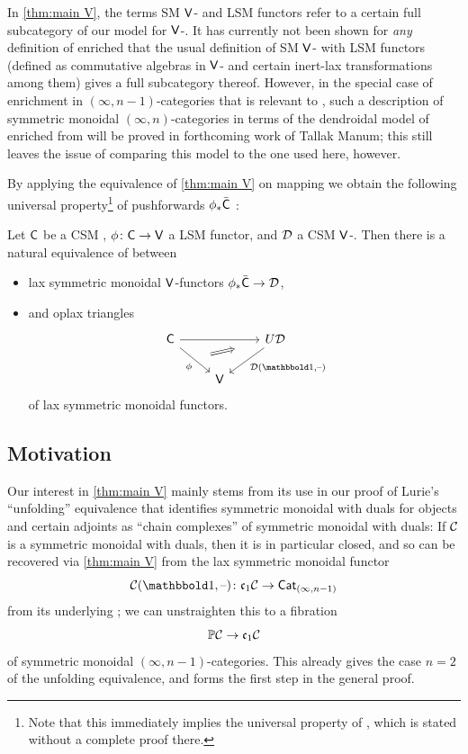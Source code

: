 \documentclass[a4paper,11pt]{article}
\newcommand{\SM}{SM}
\newcommand{\LSM}{LSM}
\newcommand{\CSM}{CSM}
\begin{document}
\begin{warning*}
  In \cref{thm:main V}, the terms \SM{} $\textup{\textsf{V}}$-\icats{} and \LSM{}
  functors refer to a certain full subcategory of our model for
  $\textup{\textsf{V}}$-\iopds{}. It has currently not been shown for \emph{any}
  definition of enriched \iopds{} that the usual definition of \SM{}
  $\textup{\textsf{V}}$-\icats{} with \LSM{} functors (defined as commutative algebras
  in $\textup{\textsf{V}}$-\icats{} and certain inert-lax transformations among them)
  gives a full subcategory thereof. However, in the special case of
  enrichment in $(\infty,n-1)$-categories that is relevant to
  \cite{unfolding}, such a description of symmetric monoidal
  $(\infty,n)$-categories in terms of the dendroidal model of enriched
  \iopds{} from \cite{enropd} will be proved in forthcoming work of
  Tallak Manum; this still leaves the issue of comparing this model to
  the one used here, however.
\end{warning*}

By applying the equivalence of \cref{thm:main V} on
mapping \icats{}
we obtain the following universal property\footnote{Note that this immediately implies the universal property of
\cite[Proposition 1.3.3]{GRV}, which is stated without a complete
proof there.} of pushforwards
$\phi_{*}\bar{\textup{\textsf{C}}}$ :
\begin{corint}
  Let $\textup{\textsf{C}}$ be a \CSM{} \icat{}, $\phi \colon \oC \to \oV$ a \LSM{}
  functor, and $\mathcal{D}$ a \CSM{} $\textup{\textsf{V}}$-\icat{}. Then there is a natural
  equivalence of \icats{} between
  \begin{itemize}
  \item   lax symmetric monoidal $\textup{\textsf{V}}$-functors $\phi_{*}\bar{\oC} \to
    \eD$,
  \item and oplax triangles
        \[
    \begin{tikzcd}
     \oC \ar[rr] \ar[dr, "\phi"', ""{name=A}] & & U\eD \ar[dl, "{\eD(\bbone,\blank)}"] \\
     & \oV
     \arrow[from=A,to=1-3,Rightarrow,shorten <=8pt, shorten >=20pt]
    \end{tikzcd}
  \]
  of lax symmetric monoidal functors.
  \end{itemize}
\end{corint}

\subsection*{Motivation}
\label{mot}

Our interest in \cref{thm:main V} mainly stems from its use in our
proof \cite{unfolding} of Lurie's ``unfolding'' equivalence \cite{LurieCob} that identifies symmetric
monoidal \incats{} with duals for objects and certain adjoints as
``chain complexes'' of symmetric monoidal \icats{} with duals: If $\mathcal{C}$
is a symmetric monoidal \incat{} with duals, then it is in particular
closed, and so can be recovered via \cref{thm:main V} from the lax symmetric monoidal
functor
\[ \eC(\bbone, \blank) \colon \core[1] \eC \to \Cat_{(\infty,n-1)}\]
from its underlying \icat{}; we can unstraighten this to a fibration
\[ \mP\eC \to \core[1] \eC\] of symmetric monoidal
$(\infty,n-1)$-categories. This already gives the case $n=2$ of the
unfolding equivalence, and forms the first step in the general proof.
\end{document}
